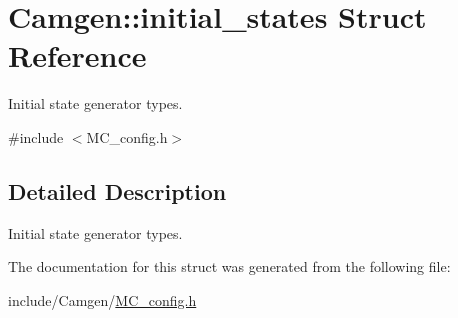 \hypertarget{a00312}{}\section{Camgen\+:\+:initial\+\_\+states Struct Reference}
\label{a00312}


Initial state generator types.  




{\ttfamily \#include $<$M\+C\+\_\+config.\+h$>$}



\subsection{Detailed Description}
Initial state generator types. 

The documentation for this struct was generated from the following file\+:\begin{DoxyCompactItemize}
\item 
include/\+Camgen/\hyperlink{a00690}{M\+C\+\_\+config.\+h}\end{DoxyCompactItemize}
